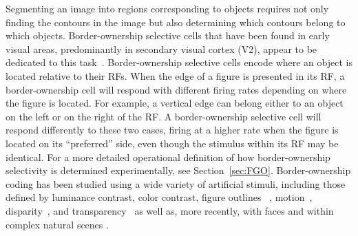 Segmenting an image into regions corresponding to objects requires not only finding the contours in the image but also determining which contours belong to which objects.
%
Border-ownership selective cells that have been found in early visual
areas, predominantly in secondary visual cortex (V2), appear to be
dedicated to this task~\citep{Zhou_etal00}. Border-ownership selective cells encode where an object is located relative to their RFs.  When the edge of a figure is presented in its RF, a border-ownership cell will respond with different firing rates depending on where the figure is located.  For example, a vertical edge can belong either to an object on the left or on the right of the RF. A border-ownership selective cell will respond differently to these two cases, firing at a higher rate when the figure is located on its ``preferred'' side, even though the stimulus within its RF may be identical. For a more detailed operational definition of how border-ownership selectivity is determined experimentally, see Section~\ref{sec:FGO}. Border-ownership coding has been studied using a wide variety of artificial stimuli, including those defined by luminance contrast, color contrast, figure outlines ~\citep{Zhou_etal00},
motion~\citep{vonderHeydt_etal03a}, disparity~\citep{Zhou_etal00,Qiu_vonderHeydt05}, and
transparency~\citep{Qiu_vonderHeydt07} as well as, more recently, with
faces \citep{Hesse_Tsao16} and within complex natural scenes
\citep{Williford_vonderHeydt14,Williford_vonderHeydt16}.

